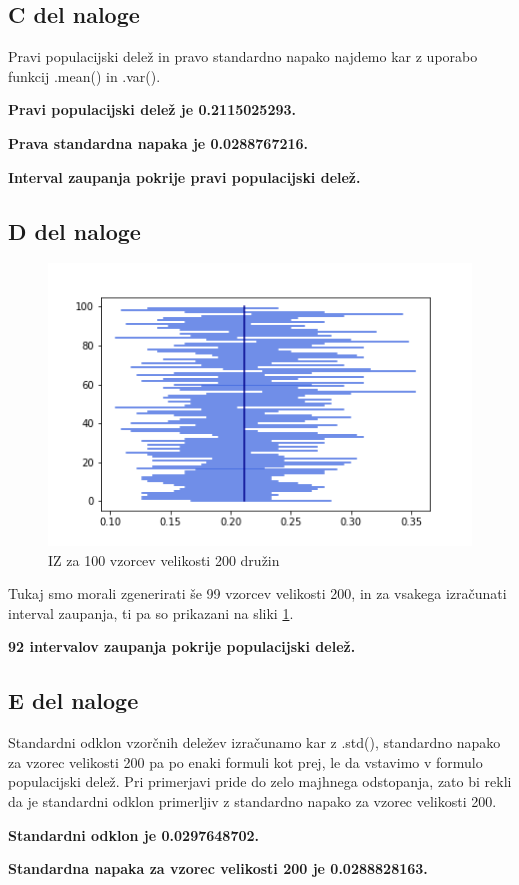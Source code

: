 \documentclass{article}
\begin{document}
    \subsection{C del naloge}
    Pravi populacijski delež in pravo standardno napako najdemo kar z uporabo funkcij .mean() in .var().
    \par \textbf{Pravi populacijski delež je 0.2115025293.}
    \par \textbf{Prava standardna napaka je 0.0288767216.}
    \par \textbf{Interval zaupanja pokrije pravi populacijski delež.}

    \subsection{D del naloge}
    \begin{figure}[H]
        \begin{center}
            \includegraphics[scale=0.5]{../PythonKoda/IZ200.png}
            \caption{IZ za 100 vzorcev velikosti 200 družin}
            \label{200}
        \end{center} 
    \end{figure}
    Tukaj smo morali zgenerirati še 99 vzorcev velikosti 200, in za vsakega izračunati interval zaupanja, ti pa so prikazani na sliki \ref{200}.
    \par \textbf{92 intervalov zaupanja pokrije populacijski delež.}

    \subsection{E del naloge}
    Standardni odklon vzorčnih deležev izračunamo kar z .std(), standardno napako za vzorec velikosti 200 pa po enaki formuli kot prej, le da vstavimo v formulo populacijski delež.
    Pri primerjavi pride do zelo majhnega odstopanja, zato bi rekli da je standardni odklon primerljiv z standardno napako za vzorec velikosti 200.
    \par \textbf{Standardni odklon je 0.0297648702.}
    \par \textbf{Standardna napaka za vzorec velikosti 200 je 0.0288828163.}
\end{document}
